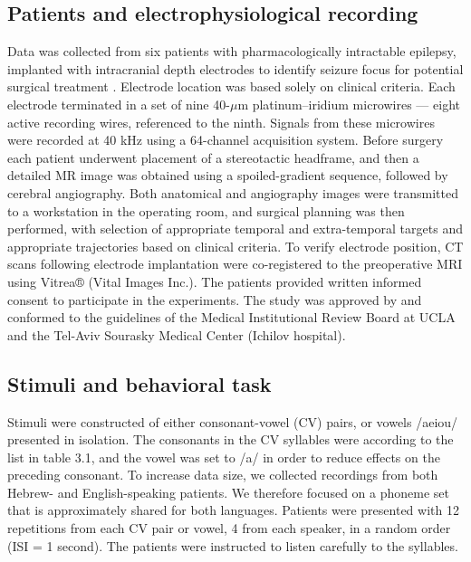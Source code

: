\subsection{Patients and electrophysiological recording}
Data was collected from six patients with pharmacologically intractable epilepsy, implanted with intracranial depth electrodes to identify seizure focus for potential surgical treatment \citep{mukamel2012human}. Electrode location was based solely on clinical criteria. Each electrode terminated in a set of nine 40-$\mu$m platinum–iridium microwires \citep{fried1999cerebral} — eight active recording wires, referenced to the ninth. Signals from these microwires were recorded at 40 kHz using a 64-channel acquisition system. Before surgery each patient underwent placement of a stereotactic headframe, and then a detailed MR image was obtained using a spoiled-gradient sequence, followed by cerebral angiography. Both anatomical and angiography images were transmitted to a workstation in the operating room, and surgical planning was then performed, with selection of appropriate temporal and extra-temporal targets and appropriate trajectories based on clinical criteria. To verify electrode position, CT scans following electrode implantation were co-registered to the preoperative MRI using Vitrea® (Vital Images Inc.). The patients provided written informed consent to participate in the experiments. The study was approved by and conformed to the guidelines of the Medical Institutional Review Board at UCLA and the Tel-Aviv Sourasky Medical Center (Ichilov hospital).

\subsection{Stimuli and behavioral task}
Stimuli were constructed of either consonant-vowel (CV) pairs, or vowels /aeiou/ presented in isolation. The consonants in the CV syllables were according to the list in table 3.1, and the vowel was set to /a/ in order to reduce effects on the preceding consonant. To increase data size, we collected recordings from both Hebrew- and English-speaking patients. We therefore focused on a phoneme set that is approximately shared for both languages. Patients  were presented with 12 repetitions from each CV pair or vowel, 4 from each speaker, in a random order (ISI = 1 second). The patients were instructed to listen carefully to the syllables.


